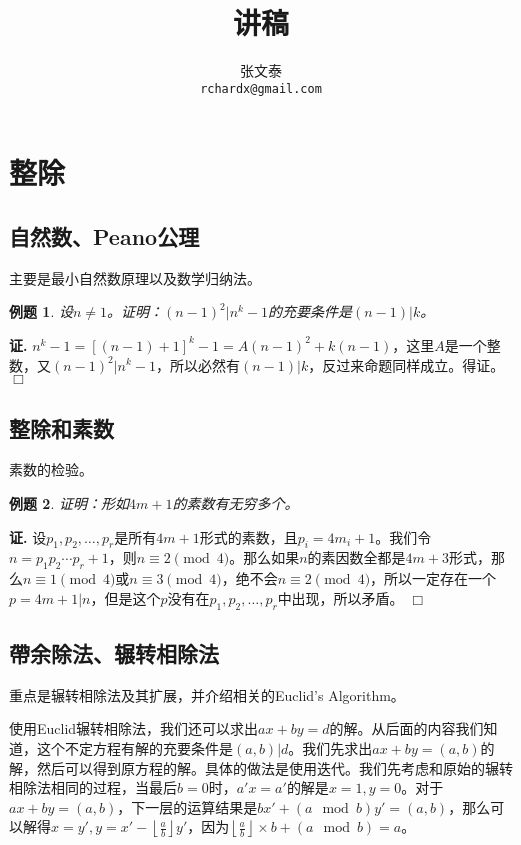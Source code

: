 \documentclass{ctexart}
\newcommand{\ffloor}[1]{{ \left\lfloor #1 \right\rfloor }}
\newtheorem{exmp}{例题}[section]
\renewenvironment{proof}[1][证]{\noindent \textbf{#1.} }{\hfill$\Box$}
\begin{document}
\title{讲稿}
\author{张文泰\\ \texttt{rchardx@gmail.com}}
\date{\version}
\maketitle

\section{整除}

\subsection{自然数、Peano公理}
主要是最小自然数原理以及数学归纳法。

\begin{exmp}
设$n\neq 1$。证明：$(n-1)^2|n^k-1$的充要条件是$(n-1)|k$。
\end{exmp}
\begin{proof}
$n^k-1=[(n-1)+1]^k-1=A(n-1)^2+k(n-1)$，这里$A$是一个整数，又$(n-1)^2|n^k-1$，所以必然有$(n-1)|k$，反过来命题同样成立。得证。
\end{proof}

\subsection{整除和素数}
素数的检验。

\begin{exmp}
证明：形如$4m+1$的素数有无穷多个。
\end{exmp}
\begin{proof}
设$p_1,p_2,\dotsc,p_r$是所有$4m+1$形式的素数，且$p_i=4m_i+1$。我们令$n=p_1p_2\dotsm p_r+1$，则$n\equiv 2\pmod{4}$。那么如果$n$的素因数全都是$4m+3$形式，那么$n\equiv 1\pmod{4}$或$n\equiv 3\pmod{4}$，绝不会$n\equiv 2\pmod{4}$，所以一定存在一个$p=4m+1 | n$，但是这个$p$没有在$p_1,p_2,\dotsc,p_r$中出现，所以矛盾。
\end{proof}

\subsection{帶余除法、辗转相除法}
重点是辗转相除法及其扩展，并介绍相关的Euclid's Algorithm。

使用Euclid辗转相除法，我们还可以求出$ax+by=d$的解。从后面的内容我们知道，这个不定方程有解的充要条件是$(a,b)|d$。我们先求出$ax+by=(a,b)$的解，然后可以得到原方程的解。具体的做法是使用迭代。我们先考虑和原始的辗转相除法相同的过程，当最后$b=0$时，$a'x=a'$的解是$x=1, y=0$。对于$ax+by=(a,b)$，下一层的运算结果是$bx'+(a\mod b)y'=(a,b)$，那么可以解得$x=y',y=x'-\ffloor{\frac{a}{b}}y'$，因为$\ffloor{\frac{a}{b}}\times b+(a\mod b)=a$。
\end{document}
